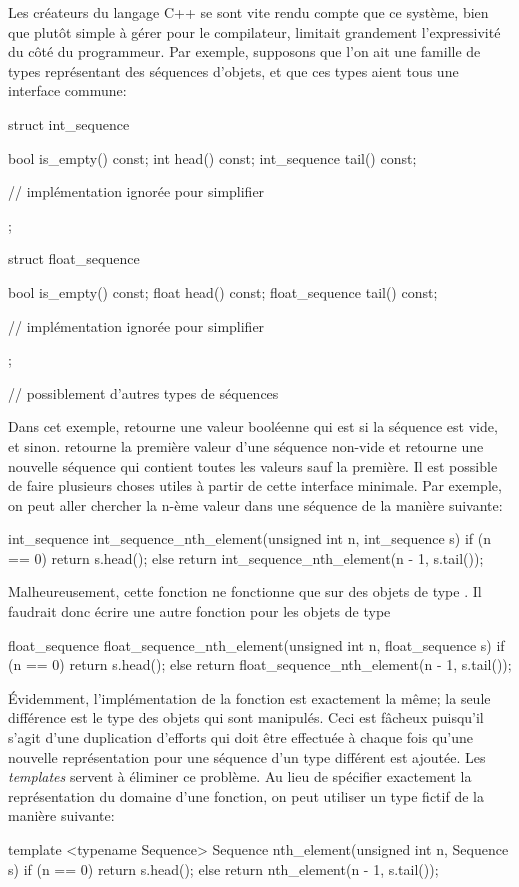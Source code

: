 Les créateurs du langage C++ se sont vite rendu compte que ce système,
bien que plutôt simple à gérer pour le compilateur, limitait grandement
l'expressivité du côté du programmeur. Par exemple, supposons que l'on
ait une famille de types représentant des séquences d'objets, et que ces
types aient tous une interface commune:

\begin{cpp}
    struct int_sequence {
        bool is_empty() const;
        int head() const;
        int_sequence tail() const;

        // implémentation ignorée pour simplifier
    };

    struct float_sequence {
        bool is_empty() const;
        float head() const;
        float_sequence tail() const;

        // implémentation ignorée pour simplifier
    };

    // possiblement d'autres types de séquences
\end{cpp}

Dans cet exemple,  retourne une valeur booléenne qui est 
si la séquence est vide, et  sinon.  retourne la première
valeur d'une séquence non-vide et  retourne une nouvelle séquence
qui contient toutes les valeurs sauf la première. Il est possible de faire
plusieurs choses utiles à partir de cette interface minimale. Par exemple, on
peut aller chercher la n-ème valeur dans une séquence de la manière suivante:
\begin{cpp}
    int_sequence int_sequence_nth_element(unsigned int n, int_sequence s) {
        if (n == 0) return s.head();
        else        return int_sequence_nth_element(n - 1, s.tail());
    }
\end{cpp}

Malheureusement, cette fonction ne fonctionne que sur des objets de type
. Il faudrait donc écrire une autre fonction pour les
objets de type 
\begin{cpp}
    float_sequence float_sequence_nth_element(unsigned int n, float_sequence s) {
        if (n == 0) return s.head();
        else        return float_sequence_nth_element(n - 1, s.tail());
    }
\end{cpp}

Évidemment, l'implémentation de la fonction est exactement la même; la seule
différence est le type des objets qui sont manipulés. Ceci est fâcheux puisqu'il
s'agit d'une duplication d'efforts qui doit être effectuée à chaque fois qu'une
nouvelle représentation pour une séquence d'un type différent est ajoutée. Les
\textit{templates} servent à éliminer ce problème. Au lieu de spécifier exactement
la représentation du domaine d'une fonction, on peut utiliser un type fictif de la
manière suivante:
\begin{cpp}
    template <typename Sequence>
    Sequence nth_element(unsigned int n, Sequence s) {
        if (n == 0) return s.head();
        else        return nth_element(n - 1, s.tail());
    }
\end{cpp}

